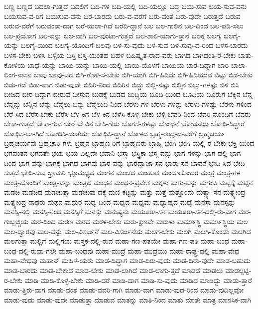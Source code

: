 {ಬಣ್ಣ
ಬಣ್ಣದ
ಬದಲಾ-ಗುತ್ತದೆ
ಬದಲಿಗೆ
ಬದಿ-ಗಳ
ಬದಿ-ಯಲ್ಲಿ
ಬದಿ-ಯಲ್ಲೂ
ಬದ್ಧ
ಬಯ-ಸುವ
ಬಯ-ಸುವ-ವನು
ಬಯಸುವ-ವ-ರಿಗೆ
ಬಯಸುವ-ವನು
ಬರ-ಬಾರದು
ಬರು-ವ-ವರೆಗೆ
ಬರು-ವಂತೆ
ಬರು-ವುದೇ
ಬರುತ್ತದೆ
ಬರುವ
ಬರುವ-ವರೆಗೆ
ಬರುವಂತಾ-ದಾಗ
ಬರೆ-ಯಲಾ-ಗಿದೆ
ಬರೆದಿ-ದ್ದಾನೆ
ಬಲ
ಬಲ-ಗಾಲಿನ
ಬಲ-ದಿಂದ
ಬಲ-ಪಡಿ-ಸಲು
ಬಲ-ಪ್ರಯೋಗ
ಬಲ-ವನ್ನು
ಬಲ-ವಾಗಿ
ಬಲ-ವುಂಟಾ-ಗುತ್ತದೆ
ಬಲ-ಶಾಲಿ-ಯಾಗು-ತ್ತಾನೆ
ಬಲಕ್ಕೆ
ಬಲಗೈ
ಬಲಗೈ-ಯನ್ನು
ಬಲಗೈ-ಯಿಂದ
ಬಲಗೈ-ಯೊಂದಿಗೆ
ಬಲವು
ಬಳ-ಸು-ವುದು
ಬಳ-ಸುವ
ಬಳ-ಸುವು-ದ-ರಿಂದ
ಬಳಸ-ಬಾರದು
ಬಳಸ-ಬೇಕು
ಬಳಸಿ
ಬಳ್ಳಿಯ
ಬಸ್ತಿ
ಬಸ್ತಿ-ಯಂತಹ
ಬಹಳ
ಬಹಿಷ್ಕೃತ-ರಾದ-ವರು
ಬಾಗಿದ
ಬಾಗಿದಂತಿ-ರ-ಬೇಕು
ಬಾತು-ಕೋಳಿಯ
ಬಾಧೆ-ಯನ್ನು
ಬಾಯಿ-ಯನ್ನು
ಬಾಯಿ-ಯಲ್ಲಿ
ಬಾಯಿ-ಯೊಳಗೆ
ಬಾಯಿಯ
ಬಾರ-ದಿದ್ದಾಗ
ಬಾರಿ
ಬಾಲಾ-ಲಿಂಗ-ನಾಸನ
ಬಾವು
ಬಾವು-ಟದ
ಬಿಗಿ-ಗೊಳಿ-ಸ-ಬೇಕು
ಬಿಗಿ-ಯಾಗಿ
ಬಿಗಿ-ಹಿಡಿದು
ಬಿಗಿ-ಹಿಡಿಯುವ
ಬಿಟ್ಟು
ಬಿಡ-ಬೇಕು
ಬಿಡು-ಗಡೆ
ಬಿಡು-ವಾಗ
ಬಿಡು-ವುದೇ
ಬಿದಿರಿ-ನಿಂದ
ಬಿದಿರಿನ
ಬಿದ್ದು
ಬಿಲ್ಲಿ-ನಷ್ಟು
ಬಿಲ್ಲಿನ
ಬಿಲ್ಲು-ಗಳಷ್ಟು
ಬಿಳಿ
ಬಿಸಿ
ಬೀಜದ
ಬೀರ-ದಿದ್ದಾಗ
ಬೀರುವ
ಬೀಸುವ
ಬುಡಕ್ಕೆ
ಬುಡದ
ಬುದ್ಧಿಯ
ಬೂದಿ-ಯಿಂದ
ಬೂದಿಯ
ಬೂರುಗ
ಬೆಕ್ಕಿನ
ಬೆನ್ನ
ಬೆನ್ನನ್ನು
ಬೆನ್ನಿನ
ಬೆನ್ನು
ಬೆನ್ನೆಲು-ಬನ್ನು
ಬೆನ್ನೆಲುಬಿ-ನಿಂದ
ಬೆರಳು-ಗಳ
ಬೆರಳು-ಗಳನ್ನು
ಬೆರಳು-ಗಳಷ್ಟು
ಬೆರಳು-ಗಳಿಂದ
ಬೆರೆ-ಸಿದ
ಬೆರೆಸ-ಬೇಕು
ಬೆರೆಸಿ
ಬೆಳ-ಕಿಗೆ
ಬೆಳ-ಕಿನ
ಬೆಳೆಸಿ-ಕೊಳ್ಳ-ಬೇಕು
ಬೆಳ್ಳಿ
ಬೆವರಿ-ನಿಂದ
ಬೆವರಿ-ನೊಂದಿಗೆ
ಬೆವರು
ಬೇಕಾ-ಗುತ್ತದೆ
ಬೇಕಾ-ಗುವ
ಬೇರೆ
ಬೇವಿನ
ಬೇಸಿ-ಗೆಯ
ಬೊಗಸೆ-ಗಳಷ್ಟು
ಬೋಧನೆ
ಬೋಧನೆಯ
ಬೋಧಿ-ಸಿದ್ದಾರೆ
ಬೋಧಿಸ-ಲಾ-ಗಿದೆ
ಬೋಧಿಸಿ-ದಂತೆಯೇ
ಬೋಧಿಸಿ-ದ್ದಾನೆ
ಬೋಳದ
ಬ್ರಹ್ಮ-ರಂಧ್ರ-ದ-ವರೆಗೆ
ಬ್ರಹ್ಮಚರ್ಯ
ಬ್ರಹ್ಮಚರ್ಯವು
ಬ್ರಹ್ಮಚಾರಿ-ಗಳು
ಬ್ರಹ್ಮನ
ಬ್ರಾಹ್ಮಣ-ರಿಗೆ
ಬ್ರಾಹ್ಮಣರು
ಬ್ರಾಹ್ಮಿ
ಭಂಗಿ
ಭಂಗಿ-ಯಲ್ಲಿ-ರ-ಬೇಕು
ಭಕ್ತಿ-ಯಿಂದ
ಭಗವಂತನ
ಭಗವತೇ
ಭಯ
ಭಯ-ವಿಲ್ಲದೇ
ಭವಾನಿ
ಭಸ್ತ್ರಾ
ಭಸ್ತ್ರಿಕಾ
ಭಸ್ಮ-ವನ್ನು
ಭಾಗ-ಗಳನ್ನು
ಭಾಗ-ದಲ್ಲಿ
ಭಾಗ-ದಿಂದ
ಭಾಗ-ವನ್ನು
ಭಾಗಕ್ಕೆ
ಭಾಗದ
ಭಾಗವು
ಭಾರ-ವನ್ನು
ಭಾರದ್ವಾಜಾ-ಸನ
ಭಾರಾ-ಸನ
ಭಾವನೆ
ಭೇದಿ-ಸಿದ
ಭೇದಿ-ಸುತ್ತದೆ
ಭೇದಿ-ಸುವ
ಭ್ರಾಮರಿ
ಭ್ರೂಮಧ್ಯದ
ಮಂಗನ
ಮಂಚದ
ಮಂಡೂಕ
ಮಂಡೂಕೋದರ
ಮಂತ್ರ
ಮಂತ್ರ-ಗಳ
ಮಂತ್ರ-ದೊಂದಿಗೆ
ಮಂತ್ರ-ವನ್ನು
ಮಂತ್ರದ
ಮಂಥನ
ಮಂಥನ-ಪ್ರವೇಶ
ಮಕ್ಕಳು
ಮಗು-ವನ್ನು
ಮಗುಚಿ
ಮಟ್ಟಕ್ಕೆ
ಮಟ್ಟಿನ
ಮಡಚಿ
ಮಡಚಿದ
ಮಡಚುತ್ತಾ
ಮಡಚುವು-ದಕ್ಕೆ
ಮಣಿ-ಕಟ್ಟನ್ನು
ಮತ್ತು
ಮತ್ತೆ
ಮತ್ತೊಂದು
ಮತ್ಸ್ಯಾ-ಸನ
ಮತ್ಸ್ಯೇಂದ್ರ
ಮತ್ಸ್ಯೇಂದ್ರ-ನಾಥರು
ಮಥನ
ಮಧುರ
ಮಧ್ಯ-ದಿಂದ
ಮಧ್ಯದ
ಮಧ್ಯಮ
ಮಧ್ಯಾಹ್ನದ
ಮಧ್ಯೆ
ಮನಸಾ
ಮನಸ್ಸನ್ನು
ಮನಸ್ಸಿ-ನಲ್ಲಿ
ಮನಸ್ಸಿ-ನಿಂದ
ಮನಸ್ಸಿಗೆ
ಮನಸ್ಸು
ಮನುಷ್ಯನು
ಮಯೂರಾ-ಸನ
ಮಯೂರಾ-ಸನ-ದಲ್ಲಿ-ರು-ವಾಗ
ಮರ-ಗುಬ್ಬಚ್ಚಿಯ
ಮರ-ದಿಂದ
ಮರಣ
ಮರದ
ಮರಳ-ಬೇಕು
ಮರು-ಕ್ಷಣವೇ
ಮರುಳು
ಮರ್ಮಾಸ್ಥಿ
ಮರ್ಮಾಸ್ಥಿಯ
ಮಲ
ಮಲ-ದ್ವಾರವು
ಮಲ-ವನ್ನು
ಮಲ-ವಿಸರ್ಜನೆ
ಮಲ-ವಿಸರ್ಜನೆಯ
ಮಲಗ-ಬೇಕು
ಮಲಗಿ
ಮಲಗಿ-ಕೊಂಡು
ಮಲಗಿದ
ಮಲಗುತ್ತಾ
ಮಲ್ಲಿಗೆ
ಮಲ್ಲಿಗೆಯ
ಮಸ್ತಕ-ದಲ್ಲಿ-ರುವ
ಮಹಾ-ಗಣ-ಪತಯೇ
ಮಹಾ-ಗಣ-ಪತಿ
ಮಹಾ-ಬಂಧ
ಮಹಾ-ಬಂಧ-ದಲ್ಲಿ-ರುವಾ-ಗಲೇ
ಮಹಾ-ಬಂಧವು
ಮಹಾ-ಮುದ್ರೆ
ಮಹಾ-ಮುದ್ರೆಯು
ಮಹಾ-ರಾಷ್ಟ್ರ-ದಲ್ಲಿ
ಮಹಾ-ವೇಧ
ಮಹಾ-ವೇಧವು
ಮಹಾನ್
ಮಹಿಳೆ-ಯರು
ಮಾಡ-ದಿದ್ದಾಗ
ಮಾಡ-ದಿರು-ವುದು
ಮಾಡ-ದಿರು-ವುದೇ
ಮಾಡ-ಬಹುದು
ಮಾಡ-ಬಾರದು
ಮಾಡ-ಬೇಕಾದ
ಮಾಡ-ಬೇಕು
ಮಾಡ-ಲಾಗಿದೆ
ಮಾಡ-ಲಾಗು-ತ್ತದೆ
ಮಾಡದೆ
ಮಾಡಲು
ಮಾಡಲ್ಪಟ್ಟಿ-ರ-ಬೇಕು
ಮಾಡಿ
ಮಾಡಿ-ಕೊಳ್ಳ-ಬೇಕು
ಮಾಡಿ-ದರೆ
ಮಾಡಿ-ದಾಗ
ಮಾಡಿ-ಸು-ವುದು
ಮಾಡಿದ
ಮಾಡಿದ್ದು
ಮಾಡು-ತ್ತಾರೆ
ಮಾಡು-ತ್ತಿರು-ವಾಗ
ಮಾಡು-ವಂತೆ
ಮಾಡು-ವವರಿ-ಗಾಗಿ
ಮಾಡು-ವಾಗ
ಮಾಡು-ವುದ-ರಿಂದ
ಮಾಡು-ವುದಿಲ್ಲವೋ
ಮಾಡು-ವುದು
ಮಾಡು-ವುದೇ
ಮಾಡುತ್ತಾ
ಮಾಡುವ
ಮಾತನ್ನು
ಮಾತಿ-ನಿಂದ
ಮಾತು
ಮಾತೇ
ಮಾತ್ರ
ಮಾನಸಿಕ-ವಾಗಿ
}
